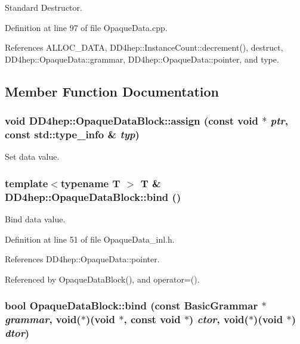 Standard Destructor. 

Definition at line 97 of file OpaqueData.cpp.

References ALLOC\_\-DATA, DD4hep::InstanceCount::decrement(), destruct, DD4hep::OpaqueData::grammar, DD4hep::OpaqueData::pointer, and type.

\subsection{Member Function Documentation}
\hypertarget{class_d_d4hep_1_1_opaque_data_block_a0e0adbb76c89f89adced464ca9e79bd7}{
\subsubsection[{assign}]{\setlength{\rightskip}{0pt plus 5cm}void DD4hep::OpaqueDataBlock::assign (const void $\ast$ {\em ptr}, \/  const std::type\_\-info \& {\em typ})}}
\label{class_d_d4hep_1_1_opaque_data_block_a0e0adbb76c89f89adced464ca9e79bd7}


Set data value. \hypertarget{class_d_d4hep_1_1_opaque_data_block_a3aa9b95d8df9109bb52f5f19711bee43}{
\subsubsection[{bind}]{\setlength{\rightskip}{0pt plus 5cm}template$<$typename T $>$ {\bf T} \& DD4hep::OpaqueDataBlock::bind ()}}
\label{class_d_d4hep_1_1_opaque_data_block_a3aa9b95d8df9109bb52f5f19711bee43}


Bind data value. 

Definition at line 51 of file OpaqueData\_\-inl.h.

References DD4hep::OpaqueData::pointer.

Referenced by OpaqueDataBlock(), and operator=().\hypertarget{class_d_d4hep_1_1_opaque_data_block_a237aa4d85136b95af80cd46be06a1053}{
\subsubsection[{bind}]{\setlength{\rightskip}{0pt plus 5cm}bool OpaqueDataBlock::bind (const {\bf BasicGrammar} $\ast$ {\em grammar}, \/  void($\ast$)(void $\ast$, const void $\ast$) {\em ctor}, \/  void($\ast$)(void $\ast$) {\em dtor})}}
\label{class_d_d4hep_1_1_opaque_data_block_a237aa4d85136b95af80cd46be06a1053}


